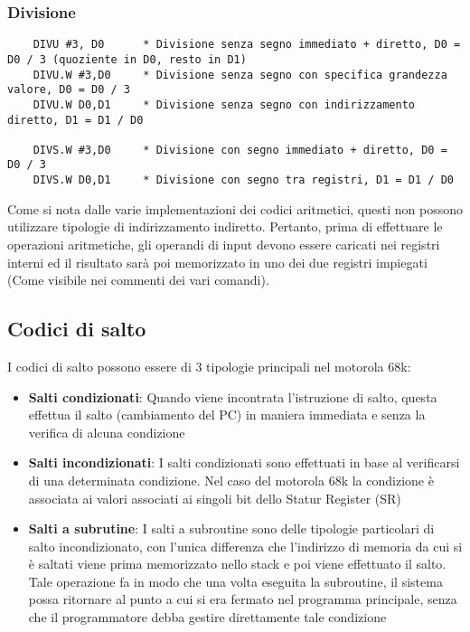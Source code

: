 \subsubsection{Divisione}

\begin{lstlisting}
    DIVU #3, D0      * Divisione senza segno immediato + diretto, D0 = D0 / 3 (quoziente in D0, resto in D1)  
    DIVU.W #3,D0     * Divisione senza segno con specifica grandezza valore, D0 = D0 / 3  
    DIVU.W D0,D1     * Divisione senza segno con indirizzamento diretto, D1 = D1 / D0  

    DIVS.W #3,D0     * Divisione con segno immediato + diretto, D0 = D0 / 3  
    DIVS.W D0,D1     * Divisione con segno tra registri, D1 = D1 / D0  
\end{lstlisting}

Come si nota dalle varie implementazioni dei codici aritmetici, questi non possono utilizzare tipologie di indirizzamento indiretto. Pertanto, prima di effettuare le operazioni aritmetiche, gli operandi di input devono essere caricati nei registri interni ed il risultato sarà poi memorizzato in uno dei due registri impiegati (Come visibile nei commenti dei vari comandi).

\subsection{Codici di salto} \label{par:salto}

I codici di salto possono essere di 3 tipologie principali nel motorola 68k:
\begin{itemize}
    \item \textbf{Salti condizionati}: Quando viene incontrata l'istruzione di salto, questa effettua il salto (cambiamento del PC) in maniera immediata e senza la verifica di alcuna condizione
    
    \item \textbf{Salti incondizionati}: I salti condizionati sono effettuati in base al verificarsi di una determinata condizione. Nel caso del motorola 68k la condizione è associata ai valori associati ai singoli bit dello Statur Register (SR)
    
    \item \textbf{Salti a subrutine}: I salti a subroutine sono delle tipologie particolari di salto incondizionato, con l'unica differenza che l'indirizzo di memoria da cui si è saltati viene prima memorizzato nello stack e poi viene effettuato il salto. Tale operazione fa in modo che una volta eseguita la subroutine, il sistema possa ritornare al punto a cui si era fermato nel programma principale, senza che il programmatore debba gestire direttamente tale condizione
\end{itemize}

